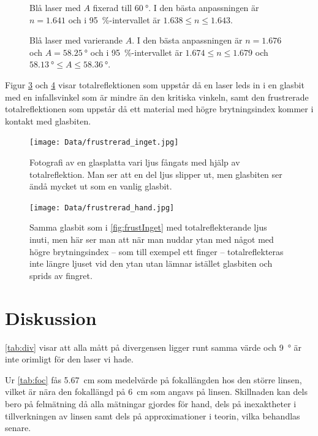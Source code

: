 \documentclass[a4paper]{article}
\begin{document}
\FloatBarrier
\begin{figure}[h]
	\centering
	
	\caption{Blå laser med $A$ fixerad till $\SI{60}{\degree}$. I den bästa anpassningen är $n=1.641$ och i \SI{95}{\percent}-intervallet är $1.638\le n \le1.643$.}
	\label{fig:blue60}
\end{figure}
\begin{figure}[h]
	\centering
	
	\caption{Blå laser med varierande $A$. I den bästa anpassningen är $n=1.676$ och $A=\SI{58.25}{\degree}$ och i \SI{95}{\percent}-intervallet är $1.674\le n \le1.679$ och $\SI{58.13}{\degree}\le A \le\SI{58.36}{\degree}$.}
	\label{fig:blue}
\end{figure}
\FloatBarrier

Figur \ref{fig:frustInget} och \ref{fig:frustHand} visar totalreflektionen som uppstår då en laser leds in i en glasbit med en infallsvinkel som är mindre än den kritiska vinkeln, samt den frustrerade totalreflektionen som uppstår då ett material med högre brytningsindex kommer i kontakt med glasbiten.

\FloatBarrier
\begin{figure}[h]
	\centering
	\texttt{[image: Data/frustrerad\_inget.jpg]}
	\caption{Fotografi av en glasplatta vari ljus fångats med hjälp av totalreflektion. Man ser att en del ljus slipper ut, men glasbiten ser ändå mycket ut som en vanlig glasbit.}
	\label{fig:frustInget}
\end{figure}
\begin{figure}[h]
	\centering
	\texttt{[image: Data/frustrerad\_hand.jpg]}
	\caption{Samma glasbit som i \autoref{fig:frustInget} med totalreflekterande ljus inuti, men här ser man att när man nuddar ytan med något med högre brytningsindex -- som till exempel ett finger -- totalreflekteras inte längre ljuset vid den ytan utan lämnar istället glasbiten och sprids av fingret.}
	\label{fig:frustHand}
\end{figure}
\FloatBarrier

\section{Diskussion}
  
\autoref{tab:div} visar att alla mått på divergensen ligger runt samma värde och \SI{9}{\degree} är inte orimligt för den laser vi hade.

Ur \autoref{tab:foc} fås \SI{5.67}{\centi\meter} som medelvärde på fokallängden hos den större linsen, vilket är nära den fokallängd på \SI{6}{\centi\meter} som angavs på linsen. Skillnaden kan dels bero på felmätning då alla mätningar gjordes för hand, dels på inexaktheter i tillverkningen av linsen samt dels på approximationer i teorin, vilka behandlas senare.
  
\end{document}
